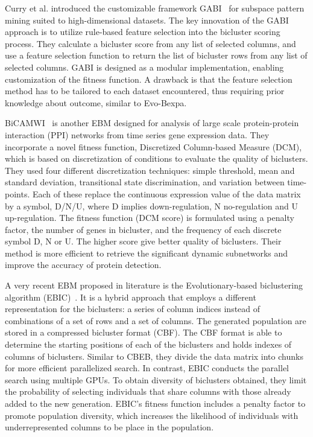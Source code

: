 Curry et al. introduced the customizable framework GABI~\cite{curry2014framework} for subspace pattern mining suited to high-dimensional datasets.
The key innovation of the GABI approach is to utilize rule-based feature selection into the bicluster scoring process.
They calculate a bicluster score from any list of selected columns, and use a feature selection function to return the list of bicluster rows from any list of selected columns.
GABI is designed as a modular implementation, enabling customization of the fitness function.
A drawback is that the feature selection method has to be tailored to each dataset encountered, thus requiring prior knowledge about outcome, similar to Evo-Bexpa.

BiCAMWI~\cite{lakizadeh2016bicamwi} is another EBM designed for analysis of large scale protein-protein interaction (PPI) networks from time series gene expression data.
They incorporate a novel fitness function, Discretized Column-based Measure (DCM), which is based on discretization of conditions to evaluate the quality of biclusters.
They used four different discretization techniques: simple threshold, mean and standard deviation, transitional state discrimination, and variation between time-points.
Each of these replace the continuous expression value of the data matrix by a symbol, D/N/U, where D implies down-regulation, N no-regulation and U up-regulation.
The fitness function (DCM score) is formulated using a penalty factor, the number of genes in bicluster, and the frequency of each discrete symbol D, N or U.
The higher score give better quality of biclusters.
Their method is more efficient to retrieve the significant dynamic subnetworks and improve the accuracy of protein detection.

A very recent EBM proposed in literature is the Evolutionary-based biclustering algorithm (EBIC)~\cite{orzechowski2018ebic}.
It is a hybrid approach that employs a different representation for the biclusters: a series of column indices instead of combinations of a set of rows and a set of columns.
The generated population are stored in a compressed bicluster format (CBF).
The CBF format is able to determine the starting positions of each of the biclusters and holds indexes of columns of biclusters.
Similar to CBEB, they divide the data matrix into chunks for more efficient parallelized search.
In contrast, EBIC conducts the parallel search using multiple GPUs.
To obtain diversity of biclusters obtained, they limit the probability of selecting individuals that share columns with those already added to the new generation.
EBIC's fitness function includes a penalty factor to promote population diversity, which increases the likelihood of individuals with underrepresented columns to be place in the population.

